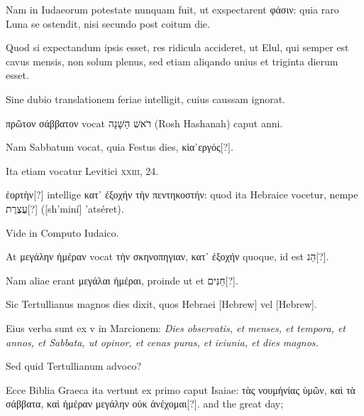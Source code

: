 \begin{parnumbers}
Nam in Iudaeorum potestate
nunquam fuit, ut exspectarent \textgreek{φάσιν}:
 quia raro Luna se ostendit,
nisi secundo post coitum die.

Quod si expectandum ipsis esset,
res ridicula accideret, ut Elul, qui semper est cavus mensis, non solum
plenus, sed etiam aliqando unius et triginta dierum esset.

Sine dubio translationem feriae intelligit, cuius caussam ignorat.

\textgreek{πρῶτον σάββατον} vocat \texthebrew{רֹאשׁ הַשָּׁנָה‎} (Rosh Hashanah) caput anni.

Nam Sabbatum vocat, quia Festus
dies, \textgreek{κὶα᾽εργός}[?].

Ita etiam vocatur Levitici \textsc{xxiii}, 24.

\textgreek{ἑορτὴν}[?]
 intellige
\textgreek{κατ᾽ ἐξοχήν τὴν πεντηκοστήν}:
 quod ita Hebraice vocetur, nempe \texthebrew{עֲצֶרֶת}[?] ([sh'miní] 'atséret).
 
Vide in Computo Iudaico.

At \textgreek{μεγάλην ἡμέραν}
 vocat \textgreek{τὴν σκηνοπηγιαν, κατ᾽ ἐξοχήν}
 quoque, id est \texthebrew{הַנ}[?].

Nam aliae erant \textgreek{μεγάλαι ἡμέραι},
proinde ut et \texthebrew{חַנִּים}[?].

Sic Tertullianus magnos dies dixit, quos
Hebraei \texthebrew{[Hebrew]} vel \texthebrew{[Hebrew]}.

Eius verba sunt ex v in Marcionem:
\textit{Dies observatis, et menses, et tempora, et annos, et Sabbata, ut opinor,
et cenas puras, et ieiunia, et dies magnos.}

Sed quid Tertullianum
advoco?

Ecce Biblia Graeca ita vertunt ex primo caput Isaiae:
\textgreek{τὰς νουμἠνίας ὑμῶν, καὶ τὰ σάββατα,
 καὶ ἡμέραν μεγάλην οὐκ ἀνέχομαι}[?].
 and the great day;


\end{parnumbers}
